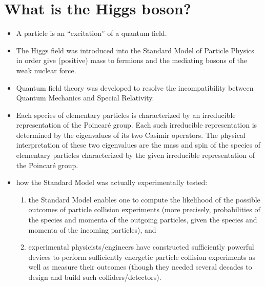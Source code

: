 

\chapter{What is the Higgs boson?}
\setcounter{theorem}{0}
\setcounter{equation}{0}


\renewcommand{\theenumi}{\roman{enumi}}
\renewcommand{\labelenumi}{\textnormal{(\theenumi)}$\;\;$}


\begin{itemize}
\item
	A particle is an ``excitation'' of a quantum field.
\item
	The Higgs field was introduced into the Standard Model of Particle Physics
	in order give (positive) mass to fermions and the mediating bosons of the
	weak nuclear force.
\item
	Quantum field theory was developed to resolve the incompatibility
	between Quantum Mechanics and Special Relativity.
\item
	Each species of elementary particles is characterized by an irreducible
	representation of the Poincaré group.
	Each such irreducible representation is determined by the eigenvalues
	of its two Casimir operators.
	The physical interpretation of these two eigenvalues are the mass and spin
	of the species of elementary particles characterized by the given
	irreducible representation of the Poincaré group.
\item
	how the Standard Model was actually experimentally tested:
	\begin{enumerate}
	\item
		the Standard Model enables one to compute the likelihood of
		the possible outcomes of particle collision experiments
		(more precisely, probabilities of the species and momenta of
		the outgoing particles, given the species and momenta
		of the incoming particles), and
	\item
		experimental physicists/engineers have constructed sufficiently
		powerful devices to perform sufficiently energetic particle collision
		experiments as well as measure their outcomes (though they
		needed several decades to design and build such colliders/detectors).
	\end{enumerate}
\end{itemize}


